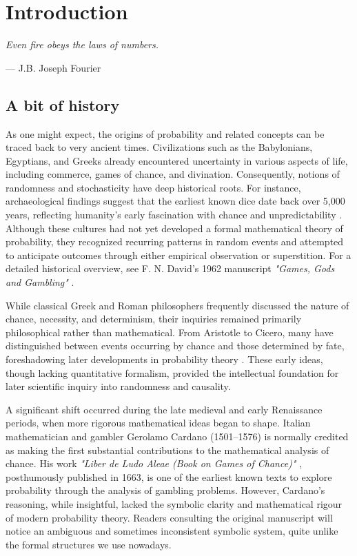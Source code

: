 \chapter*{Introduction}

\epigraph{\textit{Even fire obeys the laws of numbers.}}{— J.B. Joseph Fourier}

\section*{A bit of history}

As one might expect, the origins of probability and related concepts can be traced back to very ancient times. Civilizations such as the Babylonians, Egyptians, and Greeks already encountered uncertainty in various aspects of life, including commerce, games of chance, and divination. Consequently, notions of randomness and stochasticity have deep historical roots. For instance, archaeological findings suggest that the earliest known dice date back over 5,000 years, reflecting humanity’s early fascination with chance and unpredictability \cite{finkel_2007_dice}. Although these cultures had not yet developed a formal mathematical theory of probability, they recognized recurring patterns in random events and attempted to anticipate outcomes through either empirical observation or superstition. For a detailed historical overview, see F. N. David's 1962 manuscript \textit{"Games, Gods and Gambling"} \cite{david_1962_games}.

\medskip

While classical Greek and Roman philosophers frequently discussed the nature of chance, necessity, and determinism, their inquiries remained primarily philosophical rather than mathematical. From Aristotle to Cicero, many have distinguished between events occurring by chance and those determined by fate, foreshadowing later developments in probability theory \cite{cicero_45bce_divination}. These early ideas, though lacking quantitative formalism, provided the intellectual foundation for later scientific inquiry into randomness and causality.

A significant shift occurred during the late medieval and early Renaissance periods, when more rigorous mathematical ideas began to shape. Italian mathematician and gambler Gerolamo Cardano (1501–1576) is normally credited as making the first substantial contributions to the mathematical analysis of chance. His work \textit{"Liber de Ludo Aleae (Book on Games of Chance)"} \cite{cardano_1663_ludo}, posthumously published in 1663, is one of the earliest known texts to explore probability through the analysis of gambling problems. However, Cardano’s reasoning, while insightful, lacked the symbolic clarity and mathematical rigour of modern probability theory. Readers consulting the original manuscript will notice an ambiguous and sometimes inconsistent symbolic system, quite unlike the formal structures we use nowadays.

